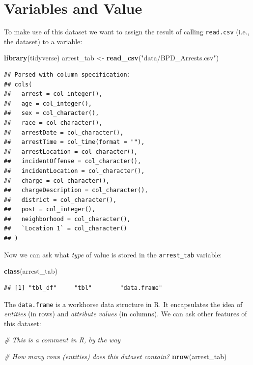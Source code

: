 \documentclass[]{book}
\newenvironment{Shaded}{\begin{snugshade}}{\end{snugshade}}
\newcommand{\KeywordTok}[1]{\textcolor[rgb]{0.13,0.29,0.53}{\textbf{#1}}}
\newcommand{\StringTok}[1]{\textcolor[rgb]{0.31,0.60,0.02}{#1}}
\newcommand{\CommentTok}[1]{\textcolor[rgb]{0.56,0.35,0.01}{\textit{#1}}}
\newcommand{\NormalTok}[1]{#1}
\theoremstyle{definition}
\theoremstyle{definition}
\theoremstyle{remark}
\begin{document}
\section{Variables and Value}\label{variables-and-value}

To make use of this dataset we want to assign the result of calling
\texttt{read.csv} (i.e., the dataset) to a variable:

\begin{Shaded}
\begin{Highlighting}[]
\KeywordTok{library}\NormalTok{(tidyverse)}
\NormalTok{arrest_tab <-}\StringTok{ }\KeywordTok{read_csv}\NormalTok{(}\StringTok{"data/BPD_Arrests.csv"}\NormalTok{)}
\end{Highlighting}
\end{Shaded}

\begin{verbatim}
## Parsed with column specification:
## cols(
##   arrest = col_integer(),
##   age = col_integer(),
##   sex = col_character(),
##   race = col_character(),
##   arrestDate = col_character(),
##   arrestTime = col_time(format = ""),
##   arrestLocation = col_character(),
##   incidentOffense = col_character(),
##   incidentLocation = col_character(),
##   charge = col_character(),
##   chargeDescription = col_character(),
##   district = col_character(),
##   post = col_integer(),
##   neighborhood = col_character(),
##   `Location 1` = col_character()
## )
\end{verbatim}

Now we can ask what \emph{type} of value is stored in the
\texttt{arrest\_tab} variable:

\begin{Shaded}
\begin{Highlighting}[]
\KeywordTok{class}\NormalTok{(arrest_tab)}
\end{Highlighting}
\end{Shaded}

\begin{verbatim}
## [1] "tbl_df"     "tbl"        "data.frame"
\end{verbatim}

The \texttt{data.frame} is a workhorse data structure in R. It
encapsulates the idea of \emph{entities} (in rows) and \emph{attribute
values} (in columns). We can ask other features of this dataset:

\begin{Shaded}
\begin{Highlighting}[]
\CommentTok{# This is a comment in R, by the way}

\CommentTok{# How many rows (entities) does this dataset contain?}
\KeywordTok{nrow}\NormalTok{(arrest_tab)}
\end{Highlighting}
\end{Shaded}
\end{document}
